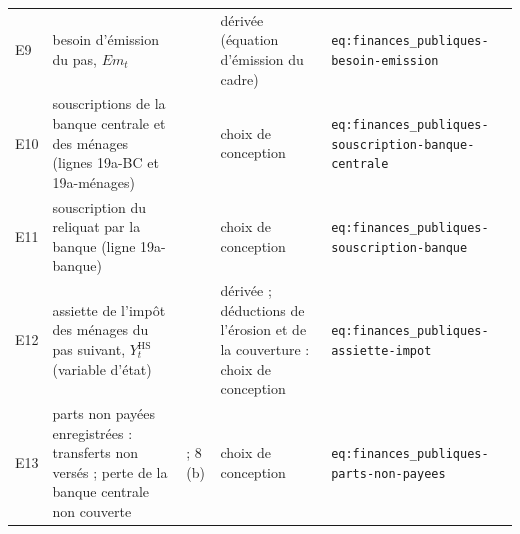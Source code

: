 \documentclass[11pt,a4paper]{article}
\begin{document}
\begin{center}
\begin{longtable}{>{\raggedright\arraybackslash}p{0.8cm}>{\raggedright\arraybackslash}p{4.6cm}>{\raggedright\arraybackslash}p{1.9cm}>{\raggedright\arraybackslash}p{3.0cm}>{\raggedright\arraybackslash}p{4.4cm}}
E9 & besoin d'émission du pas, $\mathit{Em}_t$ & 7 & dérivée (équation d'émission du cadre) & \texttt{eq:finances\_publiques-\allowbreak besoin-emission}\\
E10 & souscriptions de la banque centrale et des ménages (lignes 19a-BC et 19a-ménages) & 7 & choix de conception & \texttt{eq:finances\_publiques-\allowbreak souscription-\allowbreak banque-centrale}\\
E11 & souscription du reliquat par la banque (ligne 19a-banque) & 7 & choix de conception & \texttt{eq:finances\_publiques-\allowbreak souscription-banque}\\
E12 & assiette de l'impôt des ménages du pas suivant, $Y^{\mathrm{HS}}_t$ (variable d'état) & 7 & dérivée ; déductions de l'érosion et de la couverture : choix de conception & \texttt{eq:finances\_publiques-\allowbreak assiette-impot}\\
E13 & parts non payées enregistrées : transferts non versés ; perte de la banque centrale non couverte & 6 ; 8\,(b) & choix de conception & \texttt{eq:finances\_publiques-\allowbreak parts-non-payees}\\
\bottomrule
\end{longtable}
\end{center}
\end{document}
